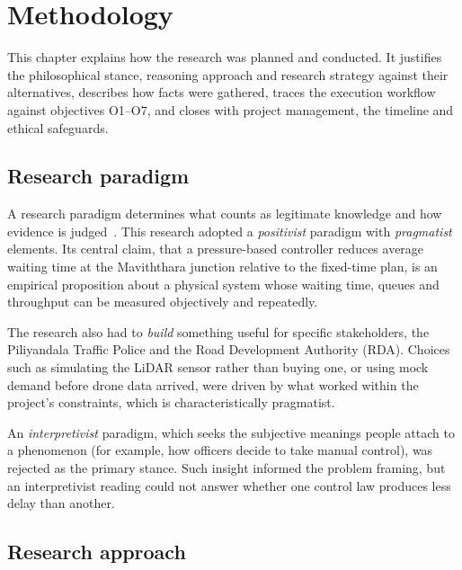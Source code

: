 \chapter{Methodology}\label{ch:method}


This chapter explains how the research was planned and conducted. It justifies the philosophical stance, reasoning approach and research strategy against their alternatives, describes how facts were gathered, traces the execution workflow against objectives O1--O7, and closes with project management, the timeline and ethical safeguards.

\section{Research paradigm}\label{sec:method-paradigm}

A research paradigm determines what counts as legitimate knowledge and how evidence is judged~\cite{saunders2019research}. This research adopted a \emph{positivist} paradigm with \emph{pragmatist} elements. Its central claim, that a pressure-based controller reduces average waiting time at the Maviththara junction relative to the fixed-time plan, is an empirical proposition about a physical system whose waiting time, queues and throughput can be measured objectively and repeatedly.

The research also had to \emph{build} something useful for specific stakeholders, the Piliyandala Traffic Police and the Road Development Authority (RDA). Choices such as simulating the LiDAR sensor rather than buying one, or using mock demand before drone data arrived, were driven by what worked within the project's constraints, which is characteristically pragmatist.

An \emph{interpretivist} paradigm, which seeks the subjective meanings people attach to a phenomenon (for example, how officers decide to take manual control), was rejected as the primary stance. Such insight informed the problem framing, but an interpretivist reading could not answer whether one control law produces less delay than another.

\section{Research approach}\label{sec:method-approach}

